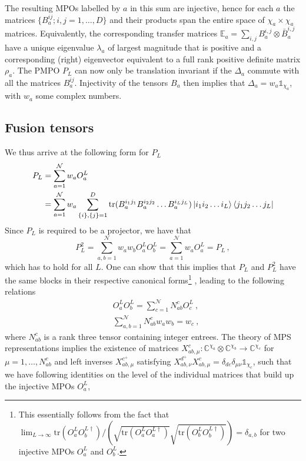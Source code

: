 \documentclass[12 pt]{article}
\begin{document}
The resulting MPOs labelled by $a$ in this sum are injective, hence for each $a$ the matrices $\{B_a^{ij}; i,j=1,\ldots,D\}$ and their products span the entire space of $\chi_a \times \chi_a$ matrices.
Equivalently, the corresponding transfer matrices $\mathbb{E}_{a}=\sum_{i,j} B_{a}^{i,j}\otimes\bar{B}_{a}^{i,j}$ have a unique eigenvalue $\lambda_a$ of largest magnitude that is positive and a corresponding (right) eigenvector equivalent to a full rank positive definite matrix $\rho_a$. The PMPO $P_L$ can now only be translation invariant if the $\Delta_a$ commute with all the matrices $B_a^{ij}$. Injectivity of the tensors $B_a$ then implies that $\Delta_a=w_a \mathds{1}_{\chi_a}$, with $w_a$ some complex numbers.

\subsection{Fusion tensors} \label{subsec:fusiontensors}
We thus arrive at the following form for $P_L$
\begin{equation}
\begin{split}
P_L & =  \sum_{a = 1}^{\mathcal{N}}w_a O^L_a \\
 & =   \sum_{a = 1}^{\mathcal{N}}w_a\sum_{\{i\}, \{j\} = 1}^{D} \text{tr}(B_a^{i_1j_1}B_a^{i_2j_2}\dots B_a^{i_Lj_L}) 
\ket{i_1 i_2\dots i_L}\bra{j_1 j_2  \dots j_L}
\end{split}
\end{equation}
Since $P_L$ is required to be a projector, we have that
\begin{equation}
P_L^2 = \sum_{a, b = 1}^{\mathcal{N}} w_a w_b O^L_a O^L_b =  \sum_{a = 1}^{\mathcal{N}}w_a O^L_a = P_L\, ,
\end{equation}
which has to hold for all $L$. One can show that this implies that $P_L$ and $P_L^2$ have the same blocks in their respective canonical forms\footnote{This essentially follows from the fact that $\lim_{L \rightarrow \infty}\text{tr}(O^L_aO_b^{L\dagger})/\left(\sqrt{\text{tr}(O^L_aO_a^{L\dagger})}\sqrt{\text{tr}(O^L_bO_b^{L\dagger})}\right) = \delta_{a,b}$ for two injective MPOs $O_a^L$ and $O^L_b$.} \cite{PerezGarciaRG}, leading to the following relations
\begin{align} \label{fusioncategory1}
& O^L_a O^L_b = \sum_{c = 1}^{\mathcal{N}} N_{ab}^c O^L_c\ ,\\
 & \sum_{a,b = 1}^{\mathcal{N}} N_{ab}^c w_a w_b = w_c\ ,
\end{align}
where $N_{ab}^c$ is a rank three tensor containing integer entrees. The theory of MPS representations \cite{MPSrepresentations} implies the existence of matrices $X_{ab,\mu}^c: \mathbb{C}^{\chi_a}\otimes  \mathbb{C}^{\chi_b} \rightarrow  \mathbb{C}^{\chi_c}$ for $\mu=1,\ldots,N_{ab}^{c}$ and left inverses $X_{ab,\mu}^{c^+}$ satisfying $X_{ab,\nu}^{d^+} X_{ab,\mu}^c = \delta_{de}\delta_{\mu\nu}\mathds{1}_{\chi_c}$, such that we have following identities on the level of the individual matrices that build up the injective MPOs $O^L_a$,
\end{document}
